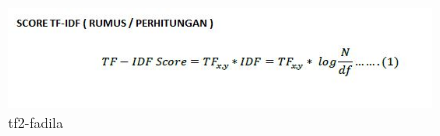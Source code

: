 \begin{enumerate}
\begin{itemize}
\begin{figure}[!hbtp]
\centering
\includegraphics[scale=0.4]{figures/tf2-fadila.jpg}
\caption{tf2-fadila}
\label{tf2-fadila}
\end{figure}
\par
\par
\end{itemize}
\par
\par

\end{enumerate}


\par
\par
